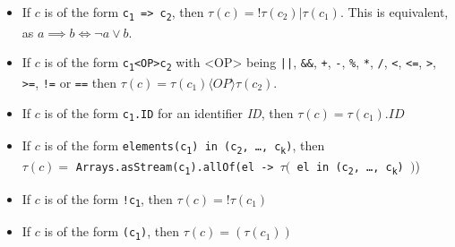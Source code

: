 \documentclass{article}
\begin{document}
\begin{itemize}
  \item If $c$ is of the form \texttt{c\textsubscript{1} => c\textsubscript{2}}, then $\tau(c) = \text{!}\tau(c_2) | \tau(c_1)$.
        This is equivalent, as $a \implies b \iff \lnot a \lor b$.
  \item If $c$ is of the form \texttt{c\textsubscript{1}<OP>c\textsubscript{2}} with <OP> being \texttt{||}, \texttt{\&\&},
        \texttt{+}, \texttt{-}, \texttt{\%}, \texttt{*}, \texttt{/}, \texttt{<}, \texttt{<=}, \texttt{>}, \texttt{>=}, \texttt{!=} or \texttt{==}
        then $\tau(c) = \tau(c_1) \langle OP \rangle \tau(c_2)$.
  \item If $c$ is of the form \texttt{c\textsubscript{1}.ID} for an identifier \textit{ID}, then
        $\tau(c) = \tau(c_1).ID$
 
  \item If $c$ is of the form \texttt{elements(c\textsubscript{1}) in (c\textsubscript{2}, \dots, c\textsubscript{k})},
        then \\
        $\tau(c) = $ \texttt{Arrays.asStream(c\textsubscript{1}).allOf(el -> $\tau($ el in (c\textsubscript{2}, \dots, c\textsubscript{k}) $)$})
   \item If $c$ is of the form \texttt{!c\textsubscript{1}}, then $\tau(c) = \text{!}\tau(c_1)$
  \item If $c$ is of the form \texttt{(c\textsubscript{1})}, then $\tau(c) = (\tau(c_1))$
  

\end{itemize}
\end{document}
